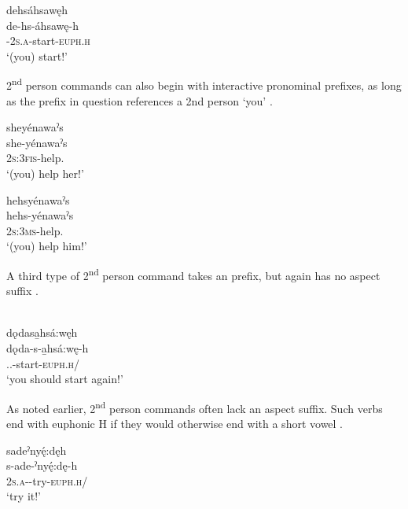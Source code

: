 
\ex dehsáhsawęh\\
\gll de-hs-áhsawę-h\\
{\cislocative}-\textsc{2s.a}-start-\textsc{euph.h}\\
\glt ‘(you) start!’

\z
\z

2\textsuperscript{nd} person commands can also begin with interactive pronominal prefixes, as long as the prefix in question references a 2nd person ‘you’ .

\ea\label{ex:commandex3} 
\ea sheyénawaˀs\\
\gll she-yénawaˀs\\
\textsc{2s:3fis}-help.{\noaspect}\\
\glt ‘(you) help her!’

\ex hehsyénawaˀs\\
\gll hehs-yénawaˀs\\
\textsc{2s:3ms}-help.{\noaspect}\\
\glt ‘(you) help him!’
\z
\z

A third type of 2\textsuperscript{nd} person command takes an  {\indefinite} prefix, but again has no aspect suffix .

\ea\label{ex:commandex13} {}\\
dǫdasa̱hsá:węh\\
\gll dǫda-s-a̱hsá:wę-h\\
{\dualic.\indefinite.\cislocative}-start-\textsc{euph.h}/{\noaspect}\\
\glt ‘you should start again!’ 
\z


As noted earlier, 2\textsuperscript{nd} person commands often lack an aspect suffix. Such verbs end with euphonic H if they would otherwise end with a short vowel . 

\newpage
\ea\label{ex:commandex6} {}
\ea sadeˀnyę́:dęh\\
\gll s-ade-ˀnyę́:dę-h\\
 \textsc{2s.a}-{\semireflexive}-try-\textsc{euph.h}/{\noaspect}\\
\glt `try it!'

